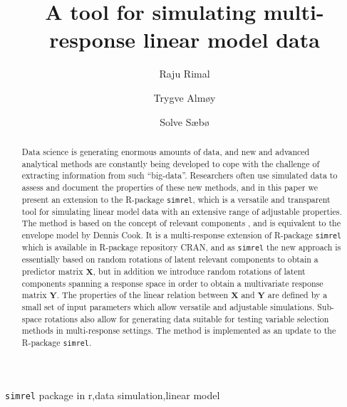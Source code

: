 \documentclass[review]{elsarticle}
\theoremstyle{definition}
\theoremstyle{definition}
\theoremstyle{remark}
\begin{document}
\begin{frontmatter}

  \title{A tool for simulating multi-response linear model data}
  
    \author[KBM]{Raju Rimal}
    \author[KBM]{Trygve Almøy}
  
    \author[NMBU]{Solve Sæbø}
  
      \address[KBM]{Faculty of Chemistry and Bioinformatics, Norwegian University of Life
Sciences, Ås, Norway}
    \address[NMBU]{Prorector, Norwegian University of Life Sciences, Ås, Norway}
  
  \begin{abstract}
  Data science is generating enormous amounts of data, and new and
  advanced analytical methods are constantly being developed to cope with
  the challenge of extracting information from such ``big-data''.
  Researchers often use simulated data to assess and document the
  properties of these new methods, and in this paper we present an
  extension to the R-package \texttt{simrel}, which is a versatile and
  transparent tool for simulating linear model data with an extensive
  range of adjustable properties. The method is based on the concept of
  relevant components \citep{helland1994comparison}, and is equivalent to
  the envelope model by Dennis Cook. It is a multi-response extension of
  R-package \texttt{simrel} which is available in R-package repository
  CRAN, and as \texttt{simrel} the new approach is essentially based on
  random rotations of latent relevant components to obtain a predictor
  matrix \(\mathbf{X}\), but in addition we introduce random rotations of
  latent components spanning a response space in order to obtain a
  multivariate response matrix \(\mathbf{Y}\). The properties of the
  linear relation between \(\mathbf{X}\) and \(\mathbf{Y}\) are defined by
  a small set of input parameters which allow versatile and adjustable
  simulations. Sub-space rotations also allow for generating data suitable
  for testing variable selection methods in multi-response settings. The
  method is implemented as an update to the R-package \texttt{simrel}.
  \end{abstract}
   \begin{keyword} \texttt{simrel} package in r,data simulation,linear model\end{keyword}

\end{frontmatter}
\end{document}
